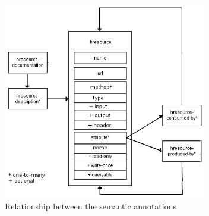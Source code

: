 \documentclass[journal]{IEEEtran}
\begin{document}
\begin{figure}[!ht]
    \centering
    \includegraphics[width=3.5in]{images/rel_semantic.png}
    \caption{Relationship between the semantic annotations}
    \label{fig:rel_semantic}
\end{figure}
\end{document}

